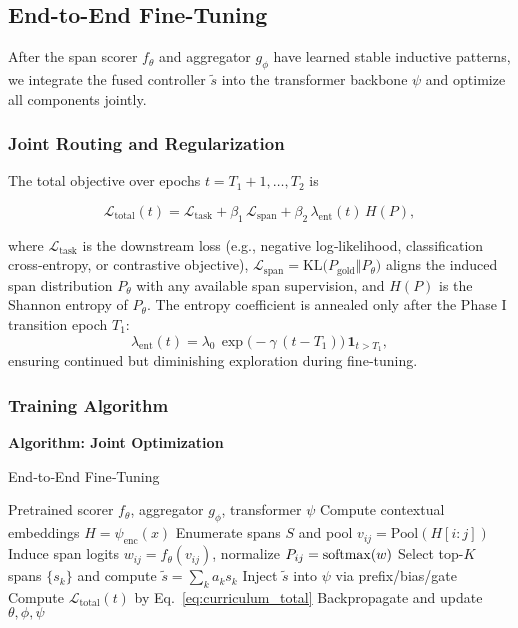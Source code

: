 \subsection{End-to-End Fine-Tuning}
\label{sec:end-to-end-finetuning}

After the span scorer \(f_\theta\) and aggregator \(g_\phi\) have learned stable inductive patterns, we integrate the fused controller \(\tilde{s}\) into the transformer backbone \(\psi\) and optimize all components jointly.

\subsubsection{Joint Routing and Regularization}
\label{sec:joint-routing-regularization}

The total objective over epochs \(t=T_1+1,\dots,T_2\) is

\begin{equation}
	\mathcal{L}_{\mathrm{total}}(t)
	= \mathcal{L}_{\mathrm{task}}
	+ \beta_{1}\,\mathcal{L}_{\mathrm{span}}
	+ \beta_{2}\,\lambda_{\mathrm{ent}}(t)\,H(P),
	\label{eq:curriculum_total}
\end{equation}

where
\(\mathcal{L}_{\mathrm{task}}\) is the downstream loss (e.g., negative log‐likelihood, classification cross‐entropy, or contrastive objective),  
\(\mathcal{L}_{\mathrm{span}} = \mathrm{KL}\bigl(P_{\mathrm{gold}}\Vert P_{\theta}\bigr)\) aligns the induced span distribution \(P_\theta\) with any available span supervision, and  
\(H(P)\) is the Shannon entropy of \(P_\theta\).  
The entropy coefficient is annealed only after the Phase I transition epoch \(T_1\):
\[
\lambda_{\mathrm{ent}}(t)
= \lambda_{0}\,\exp\bigl(-\gamma\,(t - T_1)\bigr)\,\mathbf{1}_{t > T_1},
\label{eq:entropy_schedule}
\]
ensuring continued but diminishing exploration during fine‐tuning.

\subsubsection{Training Algorithm}
\label{sec:training-algorithm}

\medskip
\noindent\textbf{Algorithm: Joint Optimization}

\begin{algorithm}[H]
	\caption{End‐to‐End Fine‐Tuning}
	\label{alg:e2e_finetuning}
	\begin{algorithmic}[1]
		\REQUIRE Pretrained scorer \(f_\theta\), aggregator \(g_\phi\), transformer \(\psi\)
		\STATE Compute contextual embeddings \(H = \psi_{\mathrm{enc}}(x)\)
		\STATE Enumerate spans \(S\) and pool \(v_{ij} = \mathrm{Pool}(H[i:j])\)
		\STATE Induce span logits \(w_{ij}=f_\theta(v_{ij})\), normalize 
		\(P_{ij}=\mathrm{softmax}(w)\)
		\STATE Select top-\(K\) spans \(\{s_k\}\) and compute \(\tilde{s}=\sum_k a_k s_k\)
		\STATE Inject \(\tilde{s}\) into \(\psi\) via prefix/bias/gate
		\STATE Compute \(\mathcal{L}_{\mathrm{total}}(t)\) by Eq.~\eqref{eq:curriculum_total}
		\STATE Backpropagate and update \(\theta,\phi,\psi\)
		\ENDFOR
		\ENDFOR
	\end{algorithmic}
\end{algorithm}

